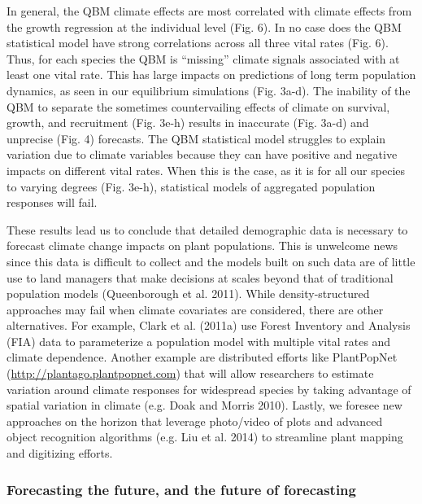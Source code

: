 \documentclass[12pt,]{article}
\begin{document}
In general, the QBM climate effects are most correlated with climate
effects from the growth regression at the individual level (Fig. 6). In
no case does the QBM statistical model have strong correlations across
all three vital rates (Fig. 6). Thus, for each species the QBM is
``missing'' climate signals associated with at least one vital rate.
This has large impacts on predictions of long term population dynamics,
as seen in our equilibrium simulations (Fig. 3a-d). The inability of the
QBM to separate the sometimes countervailing effects of climate on
survival, growth, and recruitment (Fig. 3e-h) results in inaccurate
(Fig. 3a-d) and unprecise (Fig. 4) forecasts. The QBM statistical model
struggles to explain variation due to climate variables because they can
have positive and negative impacts on different vital rates. When this
is the case, as it is for all our species to varying degrees (Fig.
3e-h), statistical models of aggregated population responses will fail.

These results lead us to conclude that detailed demographic data is
necessary to forecast climate change impacts on plant populations. This
is unwelcome news since this data is difficult to collect and the models
built on such data are of little use to land managers that make
decisions at scales beyond that of traditional population models
(Queenborough et al. 2011). While density-structured approaches may fail
when climate covariates are considered, there are other alternatives.
For example, Clark et al. (2011a) use Forest Inventory and Analysis
(FIA) data to parameterize a population model with multiple vital rates
and climate dependence. Another example are distributed efforts like
PlantPopNet (\url{http://plantago.plantpopnet.com}) that will allow
researchers to estimate variation around climate responses for
widespread species by taking advantage of spatial variation in climate
(e.g. Doak and Morris 2010). Lastly, we foresee new approaches on the
horizon that leverage photo/video of plots and advanced object
recognition algorithms (e.g. Liu et al. 2014) to streamline plant
mapping and digitizing efforts.

\subsubsection{Forecasting the future, and the future of
forecasting}\label{forecasting-the-future-and-the-future-of-forecasting}
\end{document}
